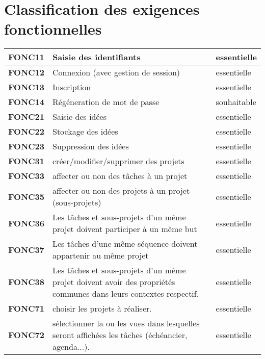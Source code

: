 \chapter{Classification des exigences fonctionnelles}


\begin{center}
\begin{tabular}{|p{3cm}|p{10cm}|p{3cm}|}

\hline  
\textbf{FONC11} & Saisie des identifiants & essentielle\\ 
\hline  
\textbf{FONC12} & Connexion (avec gestion de session) & essentielle\\
\hline 
\textbf{FONC13} & Inscription & essentielle\\ 
\hline  
\textbf{FONC14} & Régéneration de mot de passe & souhaitable \\



\hline \textbf{FONC21} & Saisie des idées & essentielle \\
\hline \textbf{FONC22} & Stockage des idées & essentielle\\
\hline \textbf{FONC23} & Suppression des idées & essentielle\\ 
\hline \textbf{FONC31} & créer/modifier/supprimer des projets & essentielle\\
\hline \textbf{FONC33} & affecter ou non des tâches à un projet & essentielle\\
\hline \textbf{FONC35} & affecter ou non des projets à un projet (sous-projets) & essentielle\\

\hline \textbf{FONC36} & Les tâches et sous-projets d'un même projet doivent participer à un même but & essentielle\\
\hline \textbf{FONC37} & Les tâches d'une même séquence doivent appartenir au même projet & essentielle\\
\hline \textbf{FONC38} & Les tâches et sous-projets d'un même projet doivent avoir des propriétés communes dans leurs contextes respectif. & essentielle\\

\hline \textbf{FONC71}& choisir les projets à réaliser. & essentielle\\
\hline \textbf{FONC72}& sélectionner la ou les vues dans lesquelles seront affichées les tâches (échéancier, agenda...). & essentielle\\


\end{tabular}
\end{center}
